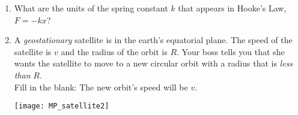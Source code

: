 \documentclass[11pt]{article}
\begin{document}
\begin{enumerate}
\vfill

\item What are the units of the spring constant $k$ that appears in Hooke's Law, $F=-kx$?

\newpage

\item A \textit{geostationary} satellite is in the earth's equatorial plane. The speed of the satellite is $v$ and the radius of the orbit is $R$. Your boss tells you that she wants the satellite to move to a new circular orbit with a radius that is \textit{less than} $R$.\\[.1in]
Fill in the blank: The new orbit's speed will be \uline{\hspace{1in}} $v$.\\
\begin{minipage}[t]{.45\lw}
\end{minipage}\hfill
\begin{minipage}[t]{.5\lw}
\vspace{0in}
\flushright
\texttt{[image: MP\_satellite2]}
\end{minipage}

\vfill


\end{enumerate}
\end{document}
